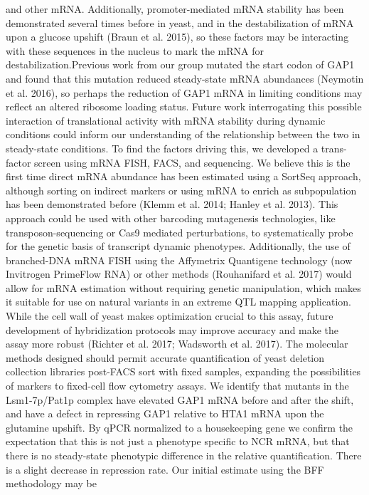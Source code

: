 and other mRNA. Additionally, promoter-mediated mRNA stability has
been demonstrated several times before in yeast, and in the
destabilization of mRNA upon a glucose upshift (Braun et al. 2015), so
these factors may be interacting with these sequences in the nucleus
to mark the mRNA for destabilization.Previous work from our group
mutated the start codon of GAP1 and found that this mutation reduced
steady-state mRNA abundances (Neymotin et al. 2016), so perhaps the
reduction of GAP1 mRNA in limiting conditions may reflect an altered
ribosome loading status. Future work interrogating this possible
interaction of translational activity with mRNA stability during
dynamic conditions could inform our understanding of the relationship
between the two in steady-state conditions.  To find the factors
driving this, we developed a trans-factor screen using mRNA FISH,
FACS, and sequencing. We believe this is the first time direct mRNA
abundance has been estimated using a SortSeq approach, although
sorting on indirect markers or using mRNA to enrich as subpopulation
has been demonstrated before (Klemm et al. 2014; Hanley et al. 2013).
This approach could be used with other barcoding mutagenesis
technologies, like transposon-sequencing or Cas9 mediated
perturbations, to systematically probe for the genetic basis of
transcript dynamic phenotypes. Additionally, the use of branched-DNA
mRNA FISH using the Affymetrix Quantigene technology (now Invitrogen
PrimeFlow RNA) or other methods (Rouhanifard et al. 2017) would allow
for mRNA estimation without requiring genetic manipulation, which
makes it suitable for use on natural variants in an extreme QTL
mapping application. While the cell wall of yeast makes optimization
crucial to this assay, future development of hybridization protocols
may improve accuracy and make the assay more robust (Richter et al.
2017; Wadsworth et al. 2017). The molecular methods designed should
permit accurate quantification of yeast deletion collection libraries
post-FACS sort with fixed samples, expanding the possibilities of
markers to fixed-cell flow cytometry assays.  We identify that mutants
in the Lsm1-7p/Pat1p complex have elevated GAP1 mRNA before and after
the shift, and have a defect in repressing GAP1 relative to HTA1 mRNA
upon the glutamine upshift. By qPCR normalized to a housekeeping gene
we confirm the expectation that this is not just a phenotype specific
to NCR mRNA, but that there is no steady-state phenotypic difference
in the relative quantification. There is a slight decrease in
repression rate. Our initial estimate using the BFF methodology may be
